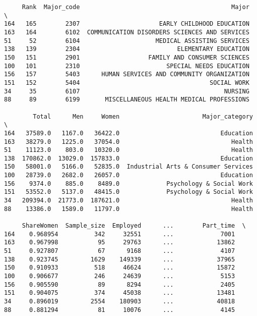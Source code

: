 \documentclass[11pt]{article}
\begin{document}
    
    \begin{verbatim}
     Rank  Major_code                                          Major  \
164   165        2307                      EARLY CHILDHOOD EDUCATION   
163   164        6102  COMMUNICATION DISORDERS SCIENCES AND SERVICES   
51     52        6104                     MEDICAL ASSISTING SERVICES   
138   139        2304                           ELEMENTARY EDUCATION   
150   151        2901                   FAMILY AND CONSUMER SCIENCES   
100   101        2310                        SPECIAL NEEDS EDUCATION   
156   157        5403      HUMAN SERVICES AND COMMUNITY ORGANIZATION   
151   152        5404                                    SOCIAL WORK   
34     35        6107                                        NURSING   
88     89        6199       MISCELLANEOUS HEALTH MEDICAL PROFESSIONS   

        Total      Men     Women                       Major_category  \
164   37589.0   1167.0   36422.0                            Education   
163   38279.0   1225.0   37054.0                               Health   
51    11123.0    803.0   10320.0                               Health   
138  170862.0  13029.0  157833.0                            Education   
150   58001.0   5166.0   52835.0  Industrial Arts & Consumer Services   
100   28739.0   2682.0   26057.0                            Education   
156    9374.0    885.0    8489.0             Psychology & Social Work   
151   53552.0   5137.0   48415.0             Psychology & Social Work   
34   209394.0  21773.0  187621.0                               Health   
88    13386.0   1589.0   11797.0                               Health   

     ShareWomen  Sample_size  Employed      ...        Part_time  \
164    0.968954          342     32551      ...             7001   
163    0.967998           95     29763      ...            13862   
51     0.927807           67      9168      ...             4107   
138    0.923745         1629    149339      ...            37965   
150    0.910933          518     46624      ...            15872   
100    0.906677          246     24639      ...             5153   
156    0.905590           89      8294      ...             2405   
151    0.904075          374     45038      ...            13481   
34     0.896019         2554    180903      ...            40818   
88     0.881294           81     10076      ...             4145   


\end{verbatim}
\end{document}
